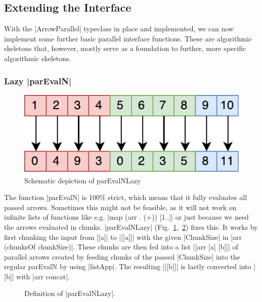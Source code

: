 \subsection{Extending the Interface}
\label{sec:extending-interface}
With the |ArrowParallel| typeclass in place and implemented, we can now implement some further basic parallel interface functions. These are algorithmic skeletons that, however, mostly serve as a foundation to further, more specific algorithmic skeletons.

\subsubsection{Lazy |parEvalN|}
\begin{figure}[h]
	\includegraphics[scale=0.7]{images/parEvalNLazy}
	\caption{Schematic depiction of parEvalNLazy}
	\label{fig:parEvalNLazyImg}
\end{figure}
The function |parEvalN| is 100\% strict, which means that it fully evaluates all passed arrows. Sometimes this might not be feasible, as it will not work on infinite lists of functions like e.g. |map (arr . (+)) [1..]| or just because we need the arrows evaluated in chunks. |parEvalNLazy| (Fig.~\ref{fig:parEvalNLazyImg},~\ref{fig:parEvalNLazy}) fixes this. It works by first chunking the input from |[a]| to |[[a]]| with the given |ChunkSize| in |arr (chunksOf chunkSize)|. These chunks are then fed into a list |[arr [a] [b]]| of parallel arrows created by feeding chunks of the passed |ChunkSize| into the regular parEvalN by using |listApp|. The resulting |[[b]]| is lastly converted into |[b]| with |arr concat|.
\begin{figure}[h]
\caption{Definition of |parEvalNLazy|.}
\label{fig:parEvalNLazy}
\end{figure}

